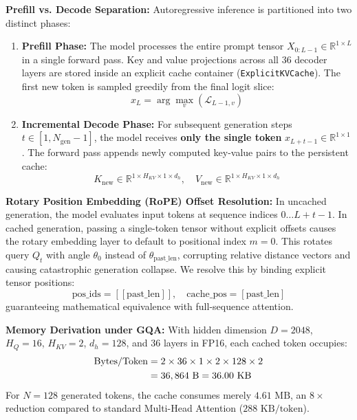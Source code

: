 \documentclass[conference]{IEEEtran}
\begin{document}
\textbf{Prefill vs. Decode Separation:} Autoregressive inference is partitioned into two distinct phases:
\begin{enumerate}
    \item \textbf{Prefill Phase:} The model processes the entire prompt tensor $X_{0:L-1} \in \mathbb{R}^{1 \times L}$ in a single forward pass. Key and value projections across all 36 decoder layers are stored inside an explicit cache container (\texttt{ExplicitKVCache}). The first new token is sampled greedily from the final logit slice:
    \begin{equation}
        x_L = \arg\max_{v} \left( \mathcal{L}_{L-1, v} \right)
    \end{equation}
    \item \textbf{Incremental Decode Phase:} For subsequent generation steps $t \in [1, N_{\text{gen}}-1]$, the model receives \textbf{only the single token} $x_{L+t-1} \in \mathbb{R}^{1 \times 1}$. The forward pass appends newly computed key-value pairs to the persistent cache:
    \begin{equation}
        K_{\text{new}} \in \mathbb{R}^{1 \times H_{KV} \times 1 \times d_h}, \quad V_{\text{new}} \in \mathbb{R}^{1 \times H_{KV} \times 1 \times d_h}
    \end{equation}
\end{enumerate}

\textbf{Rotary Position Embedding (RoPE) Offset Resolution:} In uncached generation, the model evaluates input tokens at sequence indices $0 \dots L+t-1$. In cached generation, passing a single-token tensor without explicit offsets causes the rotary embedding layer to default to positional index $m=0$. This rotates query $Q_t$ with angle $\theta_0$ instead of $\theta_{\text{past\_len}}$, corrupting relative distance vectors and causing catastrophic generation collapse. We resolve this by binding explicit tensor positions:
\begin{equation}
    \text{pos\_ids} = [[\text{past\_len}]], \quad \text{cache\_pos} = [\text{past\_len}]
\end{equation}
guaranteeing mathematical equivalence with full-sequence attention.

\textbf{Memory Derivation under GQA:} With hidden dimension $D=2048$, $H_Q=16$, $H_{KV}=2$, $d_h=128$, and 36 layers in FP16, each cached token occupies:
\begin{align}
    \text{Bytes/Token} &= 2 \times 36 \times 1 \times 2 \times 128 \times 2 \notag \\
    &= 36,864\text{ B} = 36.00\text{ KB}
\end{align}
For $N=128$ generated tokens, the cache consumes merely $4.61\text{ MB}$, an $8\times$ reduction compared to standard Multi-Head Attention ($288\text{ KB/token}$).
\end{document}
